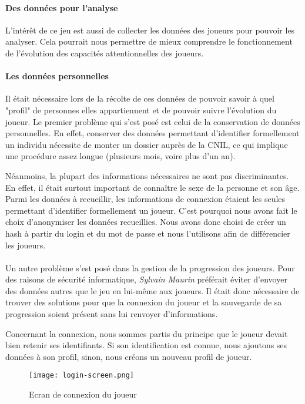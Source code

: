 \paragraph{Des données pour l'analyse}L'intérêt de ce jeu est aussi de collecter les données des joueurs pour pouvoir les analyser. Cela pourrait nous permettre de mieux comprendre le
fonctionnement de l'évolution des capacités attentionnelles des joueurs. 

\paragraph{Les données personnelles}Il était nécessaire lors de la récolte de ces données de pouvoir savoir à quel "profil" de personnes elles appartiennent et de pouvoir suivre
l'évolution du joueur. Le premier problème qui s'est posé est celui de la conservation de données personnelles. En effet, conserver des données permettant d'identifier formellement
un individu nécessite de monter un dossier auprès de la \gls{CNIL}, ce qui implique une procédure assez longue (plusieurs mois, voire plus d'un an). 

Néanmoins, la plupart des informations nécessaires ne sont pas discriminantes. En effet, il était surtout important de connaître le sexe de la personne et son âge. Parmi les données à
recueillir, les informations de connexion étaient les seules permettant d'identifier formellement un joueur. C'est pourquoi nous avons fait le choix d'anonymiser les données
recueillies. Nous avons donc choisi de créer un hash à partir du login et du mot de passe et nous l'utilisons afin de différencier les joueurs.

\paragraph{}Un autre problème s'est posé dans la gestion de la progression des joueurs. Pour des raisons de sécurité informatique, \emph{Sylvain Maurin} préférait éviter d'envoyer des
données autres que le jeu en lui-même aux joueurs. Il était donc nécessaire de trouver des solutions pour que la connexion du joueur et la sauvegarde de sa progression soient présent
sans lui renvoyer d'informations.

Concernant la connexion, nous sommes partis du principe que le joueur devait bien retenir ses identifiants. Si son identification est connue, nous ajoutons ses données à son profil,
sinon, nous créons un nouveau profil de joueur.

\begin{figure}[H]
    \begin{center}
    \texttt{[image: login-screen.png]}
    \end{center}
    \caption{Ecran de connexion du joueur}
\label{LoginScreen}
\end{figure}

